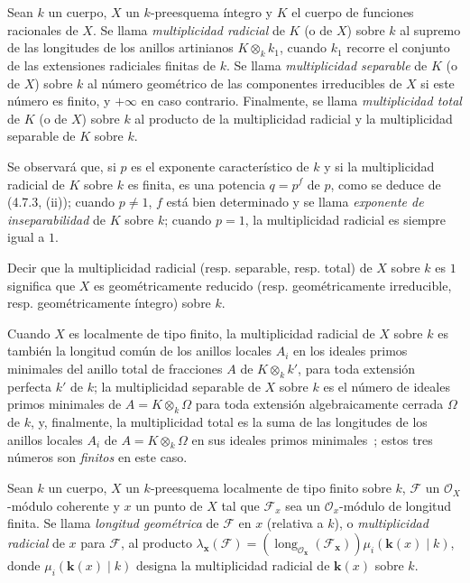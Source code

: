 \begin{definition}[4.7.4]
\label{IV.2.4.7.4-fr}
Sean $k$ un cuerpo, $X$ un $k$-preesquema íntegro y $K$ el cuerpo de funciones
racionales de $X$. Se llama \emph{multiplicidad radicial} de $K$
(o de $X$) sobre $k$ al supremo de las longitudes de los anillos artinianos
$K\otimes_k k_1$, cuando $k_1$ recorre el conjunto de las extensiones
radiciales finitas de $k$. Se llama \emph{multiplicidad separable} de $K$ (o de
$X$) sobre $k$ al número geométrico de las componentes irreducibles de $X$ si
este número es finito, y $+\infty$ en caso contrario. Finalmente, se llama
\emph{multiplicidad total} de $K$ (o de $X$) sobre $k$ al producto de la
multiplicidad radicial y la multiplicidad separable de $K$ sobre $k$.
\end{definition}

Se observará que, si $p$ es el exponente característico de $k$ y si la
multiplicidad radicial de $K$ sobre $k$ es finita, es una potencia $q=p^f$ de
$p$, como se deduce de (4.7.3, (ii)); cuando $p\ne1$, $f$ está bien determinado
y se llama \emph{exponente de inseparabilidad} de $K$ sobre $k$; cuando $p=1$,
la multiplicidad radicial es siempre igual a $1$.

Decir que la multiplicidad radicial (resp. separable, resp. total) de $X$ sobre
$k$ es $1$ significa que $X$ es geométricamente reducido (resp.
geométricamente irreducible, resp. geométricamente íntegro) sobre $k$.

Cuando $X$ es localmente de tipo finito, la multiplicidad radicial de $X$ sobre
$k$ es también la longitud común de los anillos locales $A_i$ en los ideales
primos minimales del anillo total de fracciones $A$ de $K\otimes_k k'$, para
toda extensión perfecta $k'$ de $k$; la multiplicidad separable de $X$ sobre
$k$ es el número de ideales primos minimales de $A=K\otimes_k\Omega$ para toda
extensión algebraicamente cerrada $\Omega$ de $k$, y, finalmente, la
multiplicidad total es la suma de las longitudes de los anillos locales $A_i$
de $A=K\otimes_k\Omega$ en sus ideales primos minimales~; estos tres números
son \emph{finitos} en este caso.

\begin{definition}[4.7.5]
\label{IV.2.4.7.5-fr}
Sean $k$ un cuerpo, $X$ un $k$-preesquema localmente de tipo finito sobre $k$,
$\mathscr F$ un $\mathcal O_X$-módulo coherente y $x$ un punto de $X$ tal que
$\mathscr F_x$ sea un $\mathcal O_x$-módulo de longitud finita. Se llama
\emph{longitud geométrica} de $\mathscr F$ en $x$ (relativa a $k$), o
\emph{multiplicidad radicial} de $x$ para $\mathscr F$, al producto
$\lambda_{\boldsymbol{x}}(\mathscr F)
=(\operatorname{long}_{\mathcal O_{\boldsymbol{x}}}(\mathscr F_{\boldsymbol{x}}))\mu_i(\boldsymbol{k}(x)\mid k)$,
donde $\mu_i(\boldsymbol{k}(x)\mid k)$ designa la multiplicidad radicial de $\boldsymbol{k}(x)$ sobre
$k$.
\end{definition}

